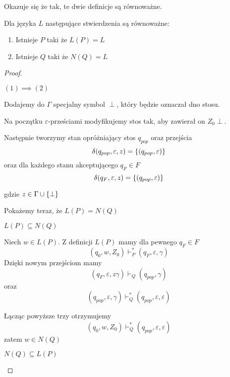 Okazuje się że tak, te dwie definicje są równoważne.
\begin{theorem}
	\label{pda-type-equivalence}
	Dla języka \( L \) następujące stwierdzenia są równoważne:
	\begin{enumerate}
		\item Istnieje \( P \) taki że \( L(P) = L \)
		\item Istnieje \( Q \) taki że \( N(Q) = L \)
	\end{enumerate}
\end{theorem}
\begin{proof} \( \)

	\begin{description}
		\item \( (1) \implies (2) \)

		      Dodajemy do \( \Gamma \) specjalny symbol \( \perp \), który będzie oznaczał dno stosu.

		      Na początku \( \varepsilon \)-prześciami modyfikujemy stos tak, aby zawierał on \( Z_0\perp \).


		      Następnie tworzymy stan opróżniający stos \( q_{pop} \) oraz przejścia
		      \[
			      \delta(q_{pop}, \varepsilon, z) = \set{(q_{pop}, \varepsilon)}
		      \]
		      oraz dla każdego stanu akceptującego \( q_F \in F \)
		      \[
			      \delta(q_F, \varepsilon, z) = \set{(q_{pop}, \varepsilon)}
		      \]

		      gdzie \( z \in \Gamma\cup \set{\perp} \)

		      Pokażemy teraz, że \( L(P) = N(Q) \)
		      \begin{description}
			      \item \( L(P) \subseteq N(Q) \)

			            Niech \( w \in L(P) \). Z definicji \( L(P) \) mamy dla pewnego \( q_F \in F \)
			            \[
				            (q_0, w, Z_0) \vdash_P^* (q_F, \varepsilon, \gamma)
			            \]
			            Dzięki nowym przejściom mamy
			            \[
				            (q_F, \varepsilon, z\gamma) \vdash_Q (q_{pop}, \gamma)
			            \]
			            oraz
			            \[
				            (q_{pop}, \varepsilon, \gamma) \vdash_Q^* (q_{pop}, \varepsilon, \varepsilon)
			            \]

			            Łącząc powyższe trzy otrzymujemy
			            \[
				            (q_0, w, Z_0) \vdash_Q^* (q_{pop}, \varepsilon, \varepsilon)
			            \]
			            zatem \( w \in N(Q) \)

			      \item \( N(Q) \subseteq L(P) \)


\end{description}
\end{description}
\end{proof}
